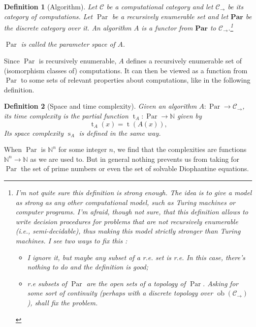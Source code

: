 \documentclass{article}
\newcommand{\cat}[1]{\mathscr{#1}}
\newcommand{\lcat}[1]{\mathbf{#1}}
\newcommand{\C}{\cat{C}}
\DeclareMathOperator{\ob}{ob}
\newcommand{\N}{\mathbb{N}}
\newcommand{\ra}{\rightarrow}
\DeclareMathOperator{\Time}{t}
\DeclareMathOperator{\Space}{s}
\DeclareMathOperator{\Par}{Par}
\newtheorem{definition}{Definition}
\begin{document}
  \begin{definition}[Algorithm]
    Let $\C$ be a computational category and let $\C_\ra$ be its
    category of computations. Let $\Par$ be a recursively enumerable
    set and let $\lcat{Par}$ be the discrete category over it. An
    \emph{algorithm} $A$ is a functor from $\lcat{Par}$ to
    $\C_\ra$.\footnote{I'm not quite sure this definition is strong
      enough. The idea is to give a model as strong as any other
      computational model, such as Turing machines or computer
      programs. I'm afraid, though not sure, that this definition
      allows to write decision procedures for problems that are not
      recursively enumerable (i.e., semi-decidable), thus making this
      model strictly stronger than Turing machines. I see two ways to
      fix this :\begin{itemize}
      \item I ignore it, but maybe any subset of a r.e. set is r.e. In
        this case, there's nothing to do and the definition is good;
      \item r.e subsets of $\Par$ are the open sets of a topology of
        $\Par$. Asking for some sort of continuity (perhaps with a
        discrete topology over $\ob(\C_\ra)$), shall fix the problem.
    \end{itemize}}

    $\Par$ is called the parameter space of $A$.
  \end{definition}

  Since $\Par$ is recursively enumerable, $A$ defines a recursively
  enumerable set of (isomorphism classes of) computations. It can then
  be viewed as a function from $\Par$ to some sets of relevant
  properties about computations, like in the following definition.

  \begin{definition}[Space and time complexity]
    Given an algorithm $A:\Par\ra\C_\ra$, its \emph{time complexity}
    is the partial function ${\Time_A:\Par\ra\N}$ given by
    \begin{equation*}
      \Time_A(x) = \Time(A(x)) \text{,}
    \end{equation*}
    Its \emph{space complexity} $\Space_A$ is defined in the same way.
  \end{definition}

  When $\Par$ is $\N^n$ for some integer $n$, we find that the
  complexities are functions $\N^n\ra\N$ as we are used to. But in
  general nothing prevents us from taking for $\Par$ the set of prime
  numbers or even the set of solvable Diophantine equations.
\end{document}
